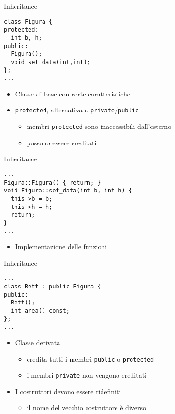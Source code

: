 \begin{frame}[fragile]{Inheritance}
  \vfill
  \begin{lstlisting}[firstnumber=2]
class Figura {
protected:
  int b, h;
public:
  Figura();
  void set_data(int,int);
};
...\end{lstlisting}
  \vfill
  \begin{itemize}
    \item Classe di base con certe caratteristiche
    \vfill
    \item \lstinline$protected$, alternativa a \lstinline$private$/\lstinline$public$
    \begin{itemize}
      \item membri \lstinline$protected$ sono inaccessibili dall'esterno
      \item possono essere \alert{ereditati}
    \end{itemize}
  \end{itemize}
  \vfill
\end{frame}

\begin{frame}[fragile]{Inheritance}
  \vfill
  \begin{lstlisting}[firstnumber=13]
...
Figura::Figura() { return; }
void Figura::set_data(int b, int h) {
  this->b = b;
  this->h = h;
  return;
}
...\end{lstlisting}
  \vfill
  \begin{itemize}
    \item Implementazione delle funzioni
  \end{itemize}
  \vfill
\end{frame}

\begin{frame}[fragile]{Inheritance}
  \vfill
  \begin{lstlisting}[firstnumber=8]
...
class Rett : public Figura {
public:
  Rett();
  int area() const;
};
...\end{lstlisting}
  \vfill
  \begin{itemize}
    \item Classe \alert{derivata}
    \begin{itemize}
      \item eredita tutti i membri \lstinline$public$ o \lstinline$protected$
      \item i membri \lstinline$private$ non vengono ereditati
    \end{itemize}
    \vfill
    \item I costruttori devono essere ridefiniti
    \begin{itemize}
      \item il nome del vecchio costruttore è diverso
    \end{itemize}
  \end{itemize}
  \vfill
\end{frame}

